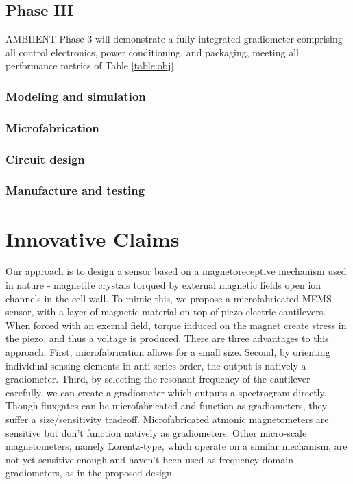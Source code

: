 \subsection{Phase III}
AMBIIENT Phase 3 will demonstrate a fully integrated gradiometer comprising all control
electronics, power conditioning, and packaging, meeting all performance metrics of Table  \ref{table:obj}

\subsubsection{Modeling and simulation}
\subsubsection{Microfabrication}
\subsubsection{Circuit design}
\subsubsection{Manufacture and testing}

\section{Innovative Claims}\label{sec:inno}

Our approach is to design a sensor based on a magnetoreceptive mechanism used in nature - magnetite crystals torqued by external magnetic fields open ion channels in the cell wall. To mimic this, we propose a microfabricated MEMS sensor, with a layer of magnetic material on top of piezo electric cantilevers. When forced with an exernal field, torque induced on the magnet create stress in the piezo, and thus a voltage is produced. There are three advantages to this approach. First, microfabrication allows for a small size. Second, by orienting individual sensing elements in anti-series order, the output is natively a gradiometer. Third, by selecting the resonant frequency of the cantilever carefully, we can create a gradiometer which outputs a spectrogram directly. Though fluxgates can be microfabricated and function as gradiometers, they suffer a size/sensitivity tradeoff. Microfabricated atmonic magnetometers are sensitive but don't function natively as gradiometers. Other micro-scale magnetometers, namely Lorentz-type, which operate on a similar mechanism, are not yet sensitive enough and haven't been used as frequency-domain gradiometers, as in the proposed design.

